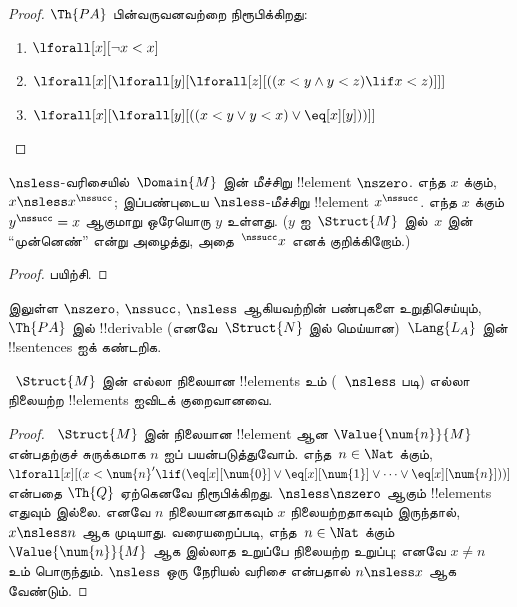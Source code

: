 \documentclass[../../../include/open-logic-section]{subfiles}
\begin{document}
\begin{proof}
$\Th{PA}$ பின்வருவனவற்றை நிரூபிக்கிறது:
\begin{enumerate}
\item $\lforall[x][\lnot x < x]$
\item $\lforall[x][\lforall[y][\lforall[z][((x < y \land y < z) \lif x < z)]]]$
\item $\lforall[x][\lforall[y][((x < y \lor y < x) \lor \eq[x][y]))]]$
\end{enumerate}
\end{proof}

\begin{prop}
 $\nsless$-வரிசையில்~$\Domain{M}$ இன்
மீச்சிறு !!{element} $\nszero$. எந்த $x$ க்கும்,
$x \nsless
x^\nssucc$; இப்பண்புடைய $\nsless$-மீச்சிறு !!{element}
$x^\nssucc$. எந்த $x$ க்கும் $y^\nssucc = x$ ஆகுமாறு ஒரேயொரு
$y$ உள்ளது. ($y$ ஐ~$\Struct{M}$ இல்~$x$ இன் ``முன்னெண்'' என்று
அழைத்து, அதை~$^\nssucc x$ எனக் குறிக்கிறோம்.)
\end{prop}

\begin{proof}
பயிற்சி.
\end{proof}

\begin{prob}
 இலுள்ள $\nszero$, $\nssucc$,
$\nsless$ ஆகியவற்றின் பண்புகளை உறுதிசெய்யும்,~$\Th{PA}$ இல்
!!{derivable} (எனவே~$\Struct{N}$ இல் மெய்யான)~$\Lang{L_A}$ இன்
!!{sentence}s ஐக் கண்டறிக.
\end{prob}

\begin{prop}
~$\Struct{M}$ இன் எல்லா நிலையான !!{element}s உம்
(~$\nsless$ படி) எல்லா நிலையற்ற !!{element}s ஐவிடக் குறைவானவை.
\end{prop}

\begin{proof}
~$\Struct{M}$ இன் நிலையான !!{element} ஆன
$\Value{\num{n}}{M}$ என்பதற்குச் சுருக்கமாக $n$ ஐப் பயன்படுத்துவோம்.
எந்த~$n
\in \Nat$ க்கும், $\lforall[x][(x < \num{n}' \lif
(\eq[x][\num{0}] \lor
  \eq[x][\num{1}] \lor \dots \lor \eq[x][\num{n}]))]$ என்பதை
$\Th{Q}$ ஏற்கெனவே நிரூபிக்கிறது. $\nsless \nszero$ ஆகும்
!!{element}s எதுவும் இல்லை. எனவே $n$ நிலையானதாகவும் $x$
நிலையற்றதாகவும் இருந்தால், $x \nsless n$ ஆக முடியாது. வரையறைப்படி,
எந்த~$n
\in \Nat$ க்கும் $\Value{\num{n}}{M}$ ஆக இல்லாத உறுப்பே நிலையற்ற
உறுப்பு; எனவே $x \neq n$ உம் பொருந்தும். $\nsless$ ஒரு நேரியல் வரிசை
என்பதால் $n \nsless x$ ஆக வேண்டும்.
\end{proof}
\end{document}
